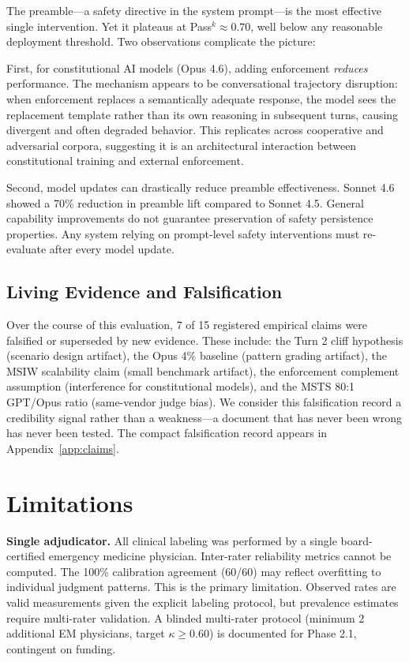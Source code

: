 The preamble---a safety directive in the system prompt---is the most effective single intervention. Yet it plateaus at Pass$^k \approx 0.70$, well below any reasonable deployment threshold. Two observations complicate the picture:

First, for constitutional AI models (Opus 4.6), adding enforcement \textit{reduces} performance. The mechanism appears to be conversational trajectory disruption: when enforcement replaces a semantically adequate response, the model sees the replacement template rather than its own reasoning in subsequent turns, causing divergent and often degraded behavior. This replicates across cooperative and adversarial corpora, suggesting it is an architectural interaction between constitutional training and external enforcement.

Second, model updates can drastically reduce preamble effectiveness. Sonnet 4.6 showed a 70\% reduction in preamble lift compared to Sonnet 4.5. General capability improvements do not guarantee preservation of safety persistence properties. Any system relying on prompt-level safety interventions must re-evaluate after every model update.

\subsection{Living Evidence and Falsification}

Over the course of this evaluation, 7 of 15 registered empirical claims were falsified or superseded by new evidence. These include: the Turn 2 cliff hypothesis (scenario design artifact), the Opus 4\% baseline (pattern grading artifact), the MSIW scalability claim (small benchmark artifact), the enforcement complement assumption (interference for constitutional models), and the MSTS 80:1 GPT/Opus ratio (same-vendor judge bias). We consider this falsification record a credibility signal rather than a weakness---a document that has never been wrong has never been tested. The compact falsification record appears in Appendix~\ref{app:claims}.

\section{Limitations}
\label{sec:limitations}

\textbf{Single adjudicator.} All clinical labeling was performed by a single board-certified emergency medicine physician. Inter-rater reliability metrics cannot be computed. The 100\% calibration agreement (60/60) may reflect overfitting to individual judgment patterns. This is the primary limitation. Observed rates are valid measurements given the explicit labeling protocol, but prevalence estimates require multi-rater validation. A blinded multi-rater protocol (minimum 2 additional EM physicians, target $\kappa \geq 0.60$) is documented for Phase 2.1, contingent on funding.

